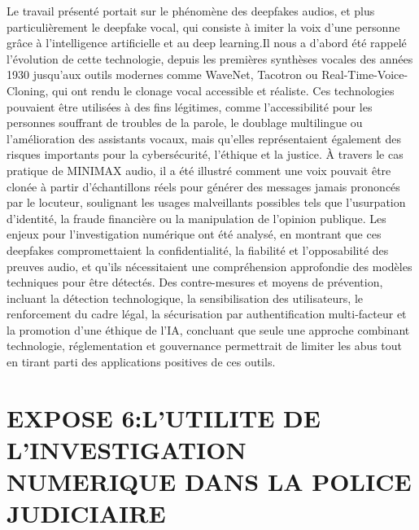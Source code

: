 \documentclass[12pt,a4paper]{report}
\begin{document}
{	
	Le travail présenté portait sur le phénomène des deepfakes audios, et plus particulièrement le deepfake vocal, qui consiste à imiter la voix d’une personne grâce à l’intelligence artificielle et au deep learning.Il nous a d’abord été rappelé l’évolution de cette technologie, depuis les premières synthèses vocales des années 1930 jusqu’aux outils modernes comme WaveNet, Tacotron ou Real-Time-Voice-Cloning, qui ont rendu le clonage vocal accessible et réaliste. Ces technologies pouvaient être utilisées à des fins légitimes, comme l’accessibilité pour les personnes souffrant de troubles de la parole, le doublage multilingue ou l’amélioration des assistants vocaux, mais qu’elles représentaient également des risques importants pour la cybersécurité, l’éthique et la justice. À travers le cas pratique de MINIMAX audio, il a été illustré comment une voix pouvait être clonée à partir d’échantillons réels pour générer des messages jamais prononcés par le locuteur, soulignant les usages malveillants possibles tels que l’usurpation d’identité, la fraude financière ou la manipulation de l’opinion publique. Les enjeux pour l’investigation numérique ont été analysé, en montrant que ces deepfakes compromettaient la confidentialité, la fiabilité et l’opposabilité des preuves audio, et qu’ils nécessitaient une compréhension approfondie des modèles techniques pour être détectés. Des contre-mesures et moyens de prévention, incluant la détection technologique, la sensibilisation des utilisateurs, le renforcement du cadre légal, la sécurisation par authentification multi-facteur et la promotion d’une éthique de l’IA, concluant que seule une approche combinant technologie, réglementation et gouvernance permettrait de limiter les abus tout en tirant parti des applications positives de ces outils.
	
	
	\section*{EXPOSE 6:L'UTILITE DE L'INVESTIGATION NUMERIQUE DANS LA POLICE JUDICIAIRE}\
	
}
\end{document}
